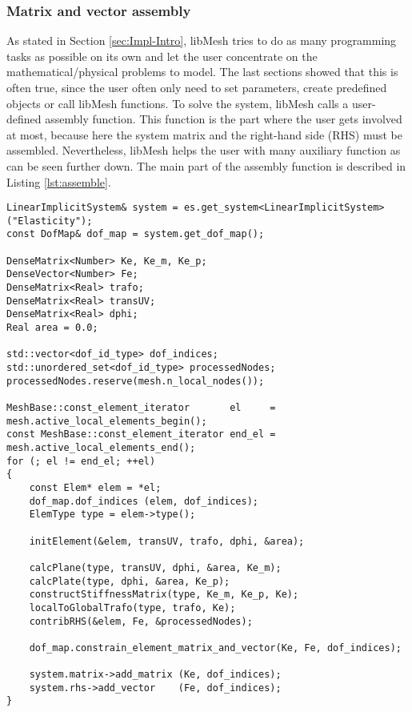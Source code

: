   
  \subsubsection{Matrix and vector assembly}\label{sec:Impl-Details-Assembly}
  As stated in Section \ref{sec:Impl-Intro}, libMesh tries to do as many programming tasks as possible on its own and let the user concentrate on the mathematical/physical problems to model. The last sections showed that this is often true, since the user often only need to set parameters, create predefined objects or call libMesh functions. To solve the system, libMesh calls a user-defined assembly function. This function is the part where the user gets involved at most, because here the system matrix and the right-hand side (RHS) must be assembled. Nevertheless, libMesh helps the user with many auxiliary function as can be seen further down. The main part of the assembly function is described in Listing \ref{lst:assemble}.
\begin{lstlisting}[caption=Assemble System Matrix and RHS,label=lst:assemble,float]
LinearImplicitSystem& system = es.get_system<LinearImplicitSystem>("Elasticity");
const DofMap& dof_map = system.get_dof_map();

DenseMatrix<Number> Ke, Ke_m, Ke_p;
DenseVector<Number> Fe;
DenseMatrix<Real> trafo;
DenseMatrix<Real> transUV;
DenseMatrix<Real> dphi;
Real area = 0.0;

std::vector<dof_id_type> dof_indices;
std::unordered_set<dof_id_type> processedNodes;
processedNodes.reserve(mesh.n_local_nodes());

MeshBase::const_element_iterator       el     = mesh.active_local_elements_begin();
const MeshBase::const_element_iterator end_el = mesh.active_local_elements_end();
for (; el != end_el; ++el)
{
	const Elem* elem = *el;
	dof_map.dof_indices (elem, dof_indices);
	ElemType type = elem->type();

	initElement(&elem, transUV, trafo, dphi, &area);

	calcPlane(type, transUV, dphi, &area, Ke_m);
	calcPlate(type, dphi, &area, Ke_p);
	constructStiffnessMatrix(type, Ke_m, Ke_p, Ke);
	localToGlobalTrafo(type, trafo, Ke);
	contribRHS(&elem, Fe, &processedNodes);

	dof_map.constrain_element_matrix_and_vector(Ke, Fe, dof_indices);

	system.matrix->add_matrix (Ke, dof_indices);
	system.rhs->add_vector    (Fe, dof_indices);
}
\end{lstlisting}
